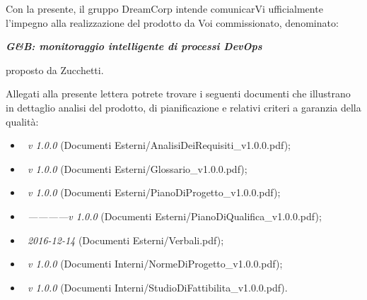 \documentclass[10pt,stdletter,dateno,sigright]{newlfm}
\begin{document}
\begin{newlfm}


Con la presente, il gruppo DreamCorp intende comunicarVi ufficialmente l'impegno alla realizzazione del prodotto da Voi commissionato, denominato:
\begin{center}
    \textbf{\textit{G&B: monitoraggio intelligente di processi DevOps}}
\end{center}
proposto da Zucchetti.

Allegati alla presente lettera potrete trovare i seguenti documenti che illustrano in dettaglio analisi del prodotto, di pianificazione e relativi criteri a garanzia della qualit\`a:
 
\begin{itemize}
    \item \textit{\AR\ v 1.0.0} (Documenti Esterni/AnalisiDeiRequisiti\_v1.0.0.pdf);
    \item \textit{\Gloss\ v 1.0.0} (Documenti Esterni/Glossario\_v1.0.0.pdf);
    \item \textit{\PdP\ v 1.0.0} (Documenti Esterni/PianoDiProgetto\_v1.0.0.pdf);
    \item \textit{\PdQ\ ------------v 1.0.0} (Documenti Esterni/PianoDiQualifica\_v1.0.0.pdf);
    \item \textit{\VerbExt\ 2016-12-14} (Documenti Esterni/Verbali.pdf);
    \item \textit{\NdP\ v 1.0.0} (Documenti Interni/NormeDiProgetto\_v1.0.0.pdf);
    \item \textit{\SdF\ v 1.0.0} (Documenti Interni/StudioDiFattibilita\_v1.0.0.pdf).
\end{itemize}
 

\end{newlfm}
\end{document}
